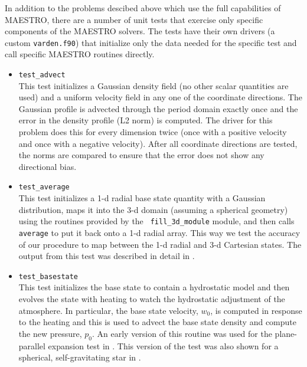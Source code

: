 \label{sec:unit_tests}

In addition to the problems descibed above which use the full
capabilities of MAESTRO, there are a number of unit tests that
exercise only specific components of the MAESTRO solvers.  The
tests have their own drivers (a custom {\tt varden.f90}) that
initialize only the data needed for the specific test and call
specific MAESTRO routines directly.

\begin{itemize}
\item {\tt test\_advect} \\[-3mm]

  This test initializes a Gaussian density field (no other scalar
  quantities are used) and a uniform velocity field in any one of the
  coordinate directions.  The Gaussian profile is advected through
  the period domain exactly once and the error in the density profile
  (L2 norm) is computed.  The driver for this problem does this 
  for every dimension twice (once with a positive velocity and once
  with a negative velocity).  After all coordinate directions are 
  tested, the norms are compared to ensure that the error does
  not show any directional bias.


\item {\tt test\_average} \\[-3mm]

  This test initializes a 1-d radial base state quantity with a
  Gaussian distribution, maps it into the 3-d domain (assuming a
  spherical geometry) using the routines provided by the {\tt
    fill\_3d\_module} module, and then calls {\tt average} to put it
  back onto a 1-d radial array.  This way we test the accuracy of our
  procedure to map between the 1-d radial and 3-d Cartesian states.
  The output from this test was described in detail in
  \cite{multilevel}.

\item {\tt test\_basestate} \\[-3mm]

  This test initializes the base state to contain a hydrostatic
  model and then evolves the state with heating to watch the 
  hydrostatic adjustment of the atmosphere.  In particular,
  the base state velocity, $w_0$, is computed in response to 
  the heating and this is used to advect the base state density
  and compute the new pressure, $p_0$.  An early version of 
  this routine was used for the plane-parallel expansion test
  in \cite{lowMach2}.  This version of the test was also shown
  for a spherical, self-gravitating star in \cite{multilevel}.


\end{itemize}
